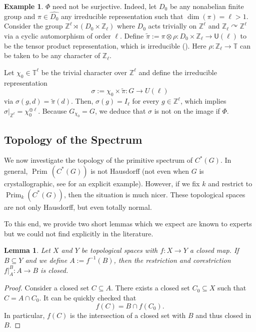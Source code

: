 \documentclass[11pt, twoside]{amsart}
\newcommand{\te}[1]{\operatorname{#1}}
\newcommand{\zn}{\mathbb{Z}}
\newcommand{\usf}{\textsf{U}}
\newtheorem{lemma}[thm]{Lemma}
\theoremstyle{definition}
\newtheorem{ex}[thm]{Example}
\newcommand{\B}{\mathbb}
\newcommand{\Z}{\B{Z}}
\newcommand{\TT}{\mathbb{T}}
\begin{document}
\begin{ex}\label{phi_not_surj}
    $\Phi$ need not be surjective. Indeed, let $D_0$ be any nonabelian finite group and $\pi\in \widehat{D_0}$ any irreducible representation such that $\dim(\pi)=\ell>1$. Consider the group $\zn^{\ell}\rtimes (D_0\times \zn_{\ell})$ where $D_0$ acts trivially on $\Z^{\ell}$ and $\Z_{\ell} \curvearrowright \Z^{\ell}$ via a cyclic automorphism of order $\ell$. Define $\widetilde{\pi}:=\pi\otimes \rho:D_0\times \Z_{\ell}\to \usf(\ell)$ to be the tensor product representation, which is irreducible (\cite[Ex. 2.36]{fulton_harris_rep_theory}). Here $\rho:\Z_{\ell} \to \TT$ can be taken to be any character of $\Z_{\ell}$. \par
     Let $\chi_0\in \TT^{\ell}$ be the trivial character over $\Z^{\ell}$ and define the irreducible representation \[\sigma:=\chi_0\times \widetilde{\pi}:G\to U(\ell)\] via $\sigma(g,d)=\widetilde{\pi}(d)$. Then, $\sigma(g)=I_{\ell}$ for every $g\in \Z^{\ell}$, which implies $\sigma|_{\zn^{\ell}}=\chi_0^{\oplus \ell}$. Because $G_{\chi_0}=G$, we deduce that $\sigma$ is not on the image if $\Phi$.
    

\end{ex}

\subsection{Topology of the Spectrum}

We now investigate the topology of the primitive spectrum of $C^*(G)$. In general, $\te{Prim}\,(C^*(G))$ is not Hausdorff (not even when $G$ is crystallographic, see \cite[Section 5]{CW24} for an explicit example). However, if we fix $k$ and restrict to $\te{Prim}_k(C^*(G))$, then the situation is much nicer. These topological spaces are not only Hausdorff, but even totally normal. \par

To this end, we provide two short lemmas which we expect are known to experts but we could not find explicitly in the literature.
\begin{lemma}\label{lem: closed restrictions}
    Let $X$ and $Y$ be topological spaces with $f:X\to Y$ a closed map. If $B\subseteq Y$ and we define $A:=f^{-1}(B)$, then the restriction and corestriction $f|_A^B: A\to B$ is closed. 
\end{lemma}

\begin{proof}
    Consider a closed set $C\subseteq A$. There exists a closed set $C_0\subseteq X$ such that $C=A\cap C_0$. It can be quickly checked that 
    \[ f(C)=B\cap f(C_0). \]
    In particular, $f(C)$ is the intersection of a closed set with $B$ and thus closed in $B$.
\end{proof}
\end{document}
